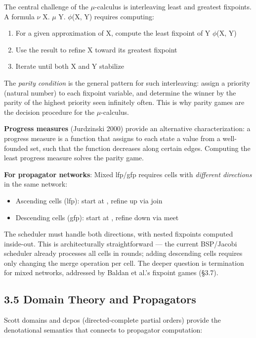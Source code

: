 \documentclass[11pt]{article}
\begin{document}
The central challenge of the \(\mu\)-calculus is interleaving least and greatest
fixpoints. A formula \(\nu\) X. \(\mu\) Y. \(\phi\)(X, Y) requires computing:
\begin{enumerate}
\item For a given approximation of X, compute the least fixpoint of Y \mapsto \(\phi\)(X, Y)
\item Use the result to refine X toward its greatest fixpoint
\item Iterate until both X and Y stabilize
\end{enumerate}

The \emph{parity condition} is the general pattern for such interleaving: assign
a priority (natural number) to each fixpoint variable, and determine the
winner by the parity of the highest priority seen infinitely often. This is
why parity games are the decision procedure for the \(\mu\)-calculus.

\textbf{Progress measures} (Jurdzinski 2000) provide an alternative characterization:
a progress measure is a function that assigns to each state a value from a
well-founded set, such that the function decreases along certain edges.
Computing the least progress measure solves the parity game.

\textbf{For propagator networks}: Mixed lfp/gfp requires cells with \emph{different
directions} in the same network:
\begin{itemize}
\item Ascending cells (lfp): start at \bot, refine up via join
\item Descending cells (gfp): start at \top, refine down via meet
\end{itemize}

The scheduler must handle both directions, with nested fixpoints computed
inside-out. This is architecturally straightforward --- the current BSP/Jacobi
scheduler already processes all cells in rounds; adding descending cells
requires only changing the merge operation per cell. The deeper question is
termination for mixed networks, addressed by Baldan et al.'s fixpoint games
(§3.7).
\subsection{3.5 Domain Theory and Propagators}
\label{sec:orgee70dd7}

Scott domains and dcpos (directed-complete partial orders) provide the
denotational semantics that connects to propagator computation:
\end{document}
